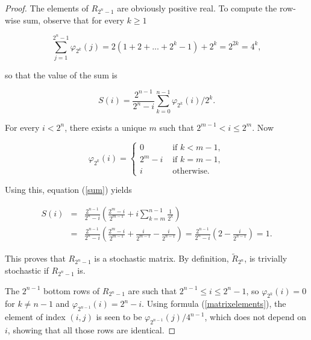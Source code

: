 \documentclass[12pt]{article}
\begin{document}
  \begin{proof}
    The elements of $R_{2^n-1}$ are obviously positive real. To compute
    the row-wise sum, observe that for every $k \geq 1$

    \begin{equation*}
      \sum_{j=1}^{2^n-1}\varphi_{2^k}(j) = 
        2(1+2+...+2^k-1) + 2^k = 2^{2k} = 4^k,
    \end{equation*}

  \noindent
  so that the value of the sum is
    
    \begin{equation}\label{sum}
      S(i) = \frac{2^{n-1}}{2^n-i}\sum_{k=0}^{n-1}\varphi_{2^k}(i)/2^k.
    \end{equation}

  For every $i < 2^n$, there exists a unique $m$ such that
  $2^{m-1} < i \leq 2^m$. Now

  \begin{equation*}
    \varphi_{2^k}(i) = \left\{
      \begin{array}{cc}
        0 & \text{ if } k < m-1, \\
        2^m-i & \text{ if } k = m-1, \\
        i & \text{ otherwise.}
      \end{array}
      \right. \label{phi}
  \end{equation*}

  Using this, equation (\ref{sum}) yields

  \begin{eqnarray*}
    S(i) &=& \frac{2^{n-1}}{2^n-i} \left( \frac{2^m-i}{2^{m-1}} +
        i \sum_{k=m}^{n-1}\frac{1}{2^k} \right) \\
      &=& \frac{2^{n-1}}{2^n-i} \left( \frac{2^m-i}{2^{m-1}} +
        \frac{i}{2^{m-1}} - \frac{i}{2^{n-1}} \right)
        = \frac{2^{n-1}}{2^n-i} \left(2 - \frac{i}{2^{n-1}} \right)
        = 1.
  \end{eqnarray*}

  This proves that $R_{2^n-1}$ is a stochastic matrix.
  By definition, $\tilde{R}_{2^n}$, is trivially stochastic
  if $R_{2^n-1}$ is.

  The $2^{n-1}$ bottom rows of $R_{2^n-1}$ are such that 
  $2^{n-1} \leq i \leq 2^n-1$, so $\varphi_{2^k}(i) = 0$ for
  $k \neq n-1$ and $\varphi_{2^{n-1}}(i) = 2^n -i$. Using formula
  (\ref{matrixelements}), the element of index $(i,j)$ is seen to be
  $\varphi_{2^{n-1}}(j)/4^{n-1}$, which does not depend on $i$,
  showing that all those rows are identical.

  \end{proof}
\end{document}
